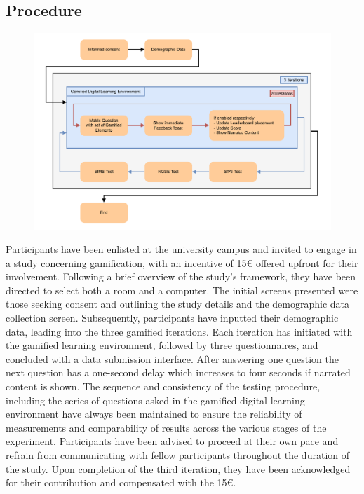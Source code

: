 \subsection{Procedure}
\begin{figure}[H]
  \centering
  \includegraphics[width=\textwidth]{img/Procedure_alt.pdf}
  \label{fig:figureDetails}
\end{figure}
Participants have been enlisted at the university campus and invited to engage in a study concerning gamification, with an incentive of 15€ offered upfront for their involvement.
Following a brief overview of the study's framework, they have been directed to select both a room and a computer.
The initial screens presented were those seeking consent and outlining the study details and the demographic data collection screen. Subsequently, participants have inputted their demographic data, leading into the three gamified iterations.
Each iteration has initiated with the gamified learning environment, followed by three questionnaires, and concluded with a data submission interface.
After answering one question the next question has a one-second delay which increases to four seconds if narrated content is shown.
The sequence and consistency of the testing procedure, including the series of questions asked in the gamified digital learning environment have always been maintained to ensure the reliability of measurements and comparability of results across the various stages of the experiment.
Participants have been advised to proceed at their own pace and refrain from communicating with fellow participants throughout the duration of the study.
Upon completion of the third iteration, they have been acknowledged for their contribution and compensated with the 15€.

